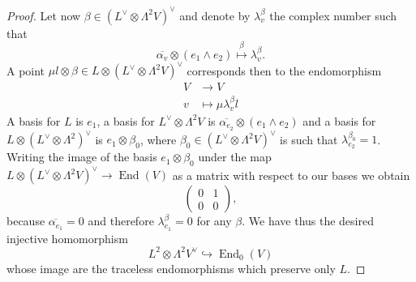 \documentclass[A4paper, 12pt, british, reqno]{amsart}
\DeclareMathOperator{\End}{End}
\newcommand{\ot}{\otimes}
\newcommand{\dual}{^{\vee}}
\begin{document}
\begin{lm}
\begin{proof}
	Let now $\beta\in (L\dual \ot \Lambda^{2}V)\dual$ and denote by $\lambda_{v}^{\beta}$ the complex number such that
	\[ \overline{\alpha_{v}}\ot (e_{1}\wedge e_{2})\overset{\beta}{\longmapsto} \lambda_{v}^{\beta}. \]
	A point $\mu l\ot \beta\in L\ot (L\dual\ot \Lambda^{2}V)\dual$ corresponds then to the endomorphism
	\begin{align*}
	    V &\longrightarrow V \\
	    v &\longmapsto \mu \lambda_{v}^{\beta}l
	\end{align*}
	A basis for $L$ is $e_{1}$, a basis for $L\dual \ot \Lambda^{2}V$ is $\overline{\alpha_{e_{2}}}\ot (e_{1}\wedge e_{2})$ and a basis for $L\ot (L\dual\ot \Lambda^{2})\dual$ is $e_{1}\ot \beta_{0}$, where $\beta_{0}\in (L\dual \ot \Lambda^{2}V)\dual$ is such that $\lambda_{e_{2}}^{\beta_{0}}=1$.
	Writing the image of the basis $e_{1}\ot \beta_{0}$ under the map $L\ot (L\dual\ot \Lambda^{2}V)\dual\to \End(V)$ as a matrix with respect to our bases we obtain
	\[
	    \begin{pmatrix}
		0 & 1 \\
		0 & 0
	    \end{pmatrix},
	\]
	because $\overline{\alpha_{e_{1}}}=0$ and therefore $\lambda_{e_{1}}^{\beta}=0$ for any $\beta$.
	We have thus the desired injective homomorphism
	\[ L^{2}\ot \Lambda^{2}V\dual\hookrightarrow \End_{0}(V) \]
	whose image are the traceless endomorphisms which preserve only $L$.


\end{proof}
\end{lm}
\end{document}
